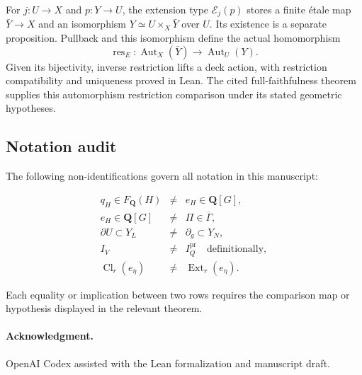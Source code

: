 \documentclass[11pt]{article}
\theoremstyle{definition}
\theoremstyle{remark}
\DeclareMathOperator{\Ext}{Ext}
\DeclareMathOperator{\Cl}{Cl}
\newcommand{\Q}{\mathbf Q}
\newcommand{\Gbar}{\overline{\Gamma}}
\begin{document}
For \(j:U\to X\) and \(p:Y\to U\), the extension type
\(\mathscr E_j(p)\) stores a finite \'etale map \(\bar Y\to X\) and
an isomorphism \(Y\simeq U\times_X\bar Y\) over \(U\). Its existence
is a separate proposition. Pullback and this isomorphism define the actual
homomorphism
\[
  \operatorname{res}_E:
  \operatorname{Aut}_X(\bar Y)\longrightarrow\operatorname{Aut}_U(Y).
\]
Given its bijectivity, inverse restriction lifts a deck action, with
restriction compatibility and uniqueness proved in Lean. The cited full-faithfulness theorem supplies this automorphism
restriction comparison under its stated geometric hypotheses.

\subsection{Notation audit}

The following non-identifications govern all notation in this manuscript:

\[
\begin{array}{rcl}
  q_H\in F_{\Q}(H) &\neq& e_H\in\Q[G],\\
  e_H\in\Q[G] &\neq& \Pi\in\Gbar,\\
  \partial U\subset Y_L &\neq& \partial_g\subset Y_N,\\
  I_V &\neq& I_Q^{\mathrm{pr}}\quad\text{definitionally},\\
  \Cl_r(e_\eta) &\neq& \Ext_r(e_\eta).
\end{array}
\]

Each equality or implication between two rows requires the comparison map or
hypothesis displayed in the relevant theorem.

\paragraph{Acknowledgment.}
OpenAI Codex assisted with the Lean formalization and manuscript draft.

\begingroup
\small


\endgroup
\end{document}
